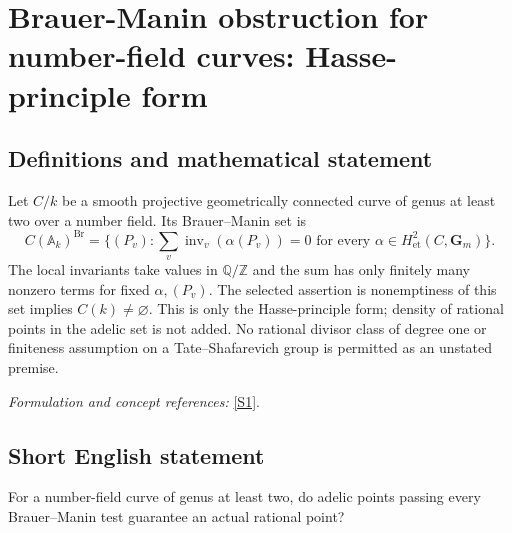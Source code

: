 \documentclass[11pt,a4paper]{article}
\newcommand{\Z}{\mathbb{Z}}
\newcommand{\Q}{\mathbb{Q}}
\newcommand{\A}{\mathbb{A}}
\newcommand{\sref}[2]{\hyperlink{source:#1:#2}{[S#2]}}
\newif\ifshowcatalogue
\newcommand{\cataloguescope}[1]{\ifshowcatalogue
 \paragraph{Exact scope in the supplied catalogue.}
 \begin{quote}\small #1\end{quote}\fi}
\begin{document}
\setcounter{section}{0}
\clearpage
\section*{\texorpdfstring{Brauer-Manin obstruction for number-field curves: Hasse-principle form}{Brauer-Manin obstruction for number-field curves: Hasse-principle form}}\label{30006791}
\subsection{Definitions and mathematical statement}
Let $C/k$ be a smooth projective geometrically connected curve of genus at least two over a number field. Its Brauer--Manin set is
\[
 C(\A_k)^{\operatorname{Br}}=
 \{(P_v):\sum_v\operatorname{inv}_v(\alpha(P_v))=0
 \text{ for every }\alpha\in H^2_{\mathrm{et}}(C,\mathbf G_m)\}.
\]
The local invariants take values in $\Q/\Z$ and the sum has only finitely many nonzero terms for fixed $\alpha,(P_v)$. The selected assertion is nonemptiness of this set implies $C(k)\ne\varnothing$. This is only the Hasse-principle form; density of rational points in the adelic set is not added. No rational divisor class of degree one or finiteness assumption on a Tate--Shafarevich group is permitted as an unstated premise.
\par\smallskip\textit{Formulation and concept references:} \sref{30006791}{1}.
\cataloguescope{For every number field k and every smooth projective geometrically connected curve C/k of genus at least two, if C(A\_k)\textasciicircum{}Br is nonempty then C(k) is nonempty. Here Br(C)=H\textasciicircum{}2\_et(C,G\_m) is the full cohomological Brauer group, and C(A\_k)\textasciicircum{}Br consists of adelic tuples (P\_v) for which sum\_v inv\_v(alpha(P\_v))=0 for every alpha in Br(C). Constants obey global reciprocity. Passing at archimedean places to connected components does not change nonemptiness. No rational base point, degree-one divisor class, Sha finiteness, rank bound or effective Jacobian presentation is assumed.}
\subsection{Short English statement}
For a number-field curve of genus at least two, do adelic points passing every Brauer–Manin test guarantee an actual rational point?
\end{document}
